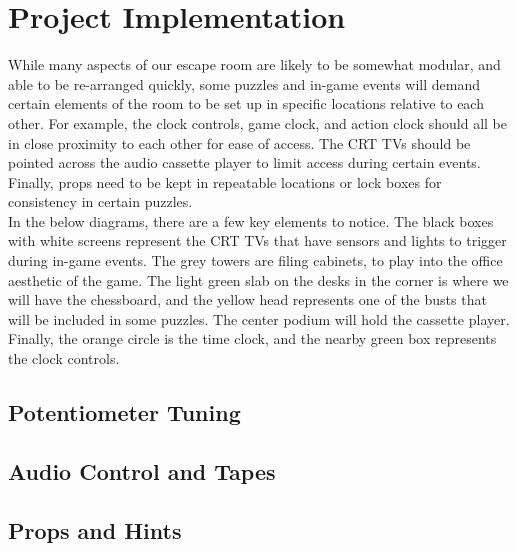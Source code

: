 \documentclass[conference]{IEEEtran}
\begin{document}
\section{Project Implementation}
While many aspects of our escape room are likely to be somewhat modular, and able to be re-arranged quickly,
some puzzles and in-game events will demand certain elements of the room to be set up in specific locations relative
to each other. For example, the clock controls, game clock, and action clock should all be in close proximity to each
other for ease of access. The CRT TVs should be pointed across the audio cassette player to limit
access during certain events. Finally, props need to be kept in repeatable
locations or lock boxes for consistency in certain puzzles.
\\
\indent In the below diagrams, there are a few key elements to notice. The black boxes with white screens
represent the CRT TVs that have sensors and lights to trigger during in-game events. The
grey towers are filing cabinets, to play into the office aesthetic of the game. The light green slab on the
desks in the corner is where we will have the chessboard, and the yellow head represents one of the busts
that will be included in some puzzles. The center podium will hold the cassette player. Finally, the orange circle
is the time clock, and the nearby green box represents the clock controls.


\subsection{Potentiometer Tuning}


\subsection{Audio Control and Tapes}

\subsection{Props and Hints}
\end{document}
